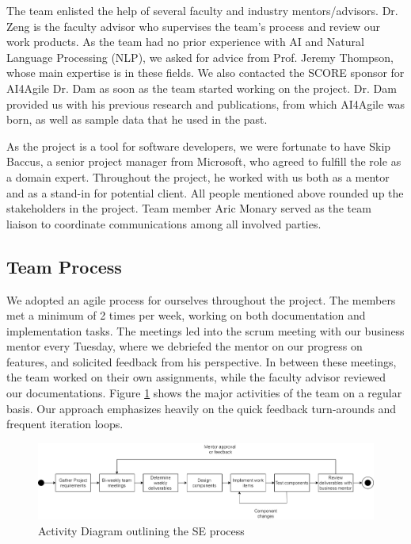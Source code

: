 The team enlisted the help of several faculty and industry mentors/advisors. Dr. Zeng is the faculty advisor who supervises the team's process and review our work products. As the team had no prior experience with AI and Natural Language Processing (NLP), we asked for advice from Prof. Jeremy Thompson, whose main expertise is in these fields. We also contacted the SCORE sponsor for AI4Agile Dr. Dam as soon as the team started working on the project. Dr. Dam provided us with his previous research and publications, from which AI4Agile was born, as well as sample data that he used in the past. 

As the project is a tool for software developers, we were fortunate to have Skip Baccus, a senior project manager from Microsoft, who agreed to fulfill the role as a domain expert. Throughout the project, he worked with us both as a mentor and as a stand-in for potential client. All people mentioned above rounded up the stakeholders in the project. Team member Aric Monary served as the team liaison to coordinate communications among all involved parties.

\subsection{Team Process}
We adopted an agile process for ourselves throughout the project. The members met a minimum of 2 times per week, working on both documentation and implementation tasks. The meetings led into the scrum meeting with our business mentor every Tuesday, where we debriefed the mentor on our progress on features, and solicited feedback from his perspective. In between these meetings, the team worked on their own assignments, while the faculty advisor reviewed our documentations. Figure \ref{fig:acd} shows the major activities of the team on a regular basis. Our approach emphasizes heavily on the quick feedback turn-arounds and frequent iteration loops. 

\begin{figure}
\centering
\includegraphics[width=\textwidth,keepaspectratio]{./figure/ActivityDiagram.png}
\caption{Activity Diagram outlining the SE process}
\label{fig:acd}
\end{figure}

